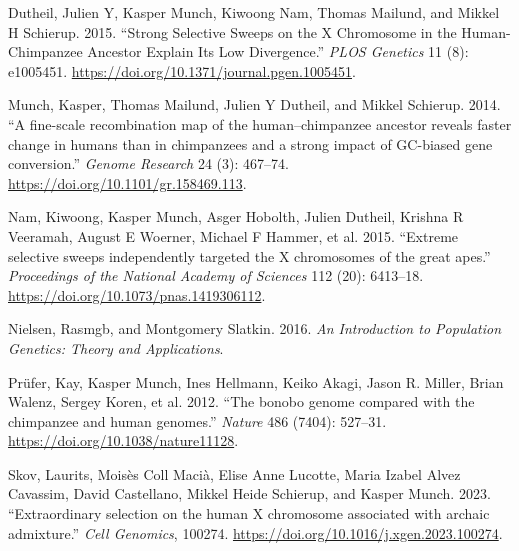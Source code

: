 \documentclass[
  a4paper,
]{scrbook}
\newlength{\cslhangindent}
\newenvironment{CSLReferences}[2] %
 {\begin{list}{}{%
  \setlength{\itemindent}{0pt}
  \setlength{\leftmargin}{0pt}
  \setlength{\parsep}{0pt}
  \ifodd #1
   \setlength{\leftmargin}{\cslhangindent}
   \setlength{\itemindent}{-1\cslhangindent}
  \fi
  \setlength{\itemsep}{#2\baselineskip}}}
 {\end{list}}
\begin{document}
\label{refs}
\begin{CSLReferences}{1}{0}
Dutheil, Julien Y, Kasper Munch, Kiwoong Nam, Thomas Mailund, and Mikkel
H Schierup. 2015. {``{Strong Selective Sweeps on the X Chromosome in the
Human-Chimpanzee Ancestor Explain Its Low Divergence}.''} \emph{PLOS
Genetics} 11 (8): e1005451.
\url{https://doi.org/10.1371/journal.pgen.1005451}.

Munch, Kasper, Thomas Mailund, Julien Y Dutheil, and Mikkel Schierup.
2014. {``{A fine-scale recombination map of the human--chimpanzee
ancestor reveals faster change in humans than in chimpanzees and a
strong impact of GC-biased gene conversion}.''} \emph{Genome Research}
24 (3): 467--74. \url{https://doi.org/10.1101/gr.158469.113}.

Nam, Kiwoong, Kasper Munch, Asger Hobolth, Julien Dutheil, Krishna R
Veeramah, August E Woerner, Michael F Hammer, et al. 2015. {``{Extreme
selective sweeps independently targeted the X chromosomes of the great
apes}.''} \emph{Proceedings of the National Academy of Sciences} 112
(20): 6413--18. \url{https://doi.org/10.1073/pnas.1419306112}.

Nielsen, Rasmgb, and Montgomery Slatkin. 2016. \emph{An Introduction to
Population Genetics: Theory and Applications}.

Prüfer, Kay, Kasper Munch, Ines Hellmann, Keiko Akagi, Jason R. Miller,
Brian Walenz, Sergey Koren, et al. 2012. {``{The bonobo genome compared
with the chimpanzee and human genomes}.''} \emph{Nature} 486 (7404):
527--31. \url{https://doi.org/10.1038/nature11128}.

Skov, Laurits, Moisès Coll Macià, Elise Anne Lucotte, Maria Izabel Alvez
Cavassim, David Castellano, Mikkel Heide Schierup, and Kasper Munch.
2023. {``{Extraordinary selection on the human X chromosome associated
with archaic admixture}.''} \emph{Cell Genomics}, 100274.
\url{https://doi.org/10.1016/j.xgen.2023.100274}.

\end{CSLReferences}


\backmatter
\end{document}
